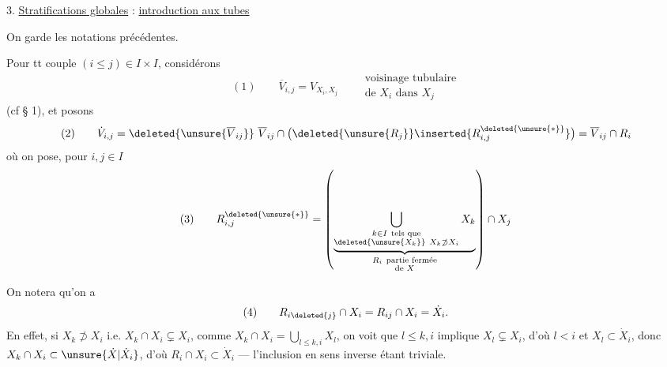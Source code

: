 3. \uline{Stratifications globales} : \uline{introduction aux tubes}

On garde les notations précédentes.

Pour tt couple $(i\leq j)\in I\times I$, considérons
\[
(1)\qquad \overline V_{i,j}=V_{X_i,X_j}\qquad
\begin{gathered}\text{voisinage tubulaire}\\\text{de }X_i\text{ dans }X_j\end{gathered}
\]
(cf § 1), et posons
\[
(2)\qquad\dot V_{i,j}=\deleted{\unsure{\overline V_{ij}}}\ \overline V_{ij}\cap\bigl(\deleted{\unsure{R_j}}\inserted{R_{i,j}^{\deleted{\unsure{*}}}}\bigr)=\overline V_{ij}\cap R_i
\]
où on pose, pour $i,j\in I$
\[
(3)\qquad R_{i,j}^{\deleted{\unsure{*}}}=\left(
\underbrace{\bigcup_{\substack{k\in I\ \text{tels que}\\\deleted{\unsure{X_k}}\ X_k\not\supset X_i}}X_k}_{\substack{R_i\ \text{partie fermée}\\\text{de }X}}
\right)\cap X_j
\]


On notera qu'on a
\[
(4)\qquad R_{i\deleted{j}}\cap X_i=R_{ij}\cap X_i=\dot X_i.
\]
En effet, si $X_k\not\supset X_i$ i.e. $X_k\cap X_i\subsetneq X_i$, comme $X_k\cap X_i=\bigcup_{l\leq k,i}X_l$, on voit que  $l\leq k,i$ implique $X_l\subsetneq X_i$, d'où $l<i$ et $X_l\subset\dot X_i$, donc $X_k\cap X_i\subset\unsure{\dot X|\dot X_i}$, d'où $R_i\cap X_i\subset\dot X_i$ — l'inclusion en sens inverse étant triviale.
